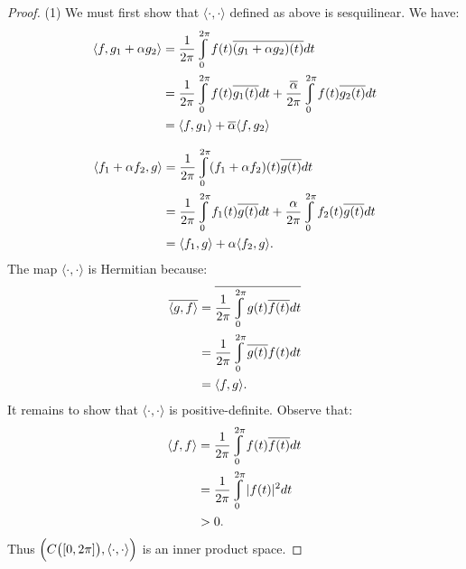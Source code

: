 \documentclass[11pt,twoside,openany]{memoir}
\renewcommand{\int}{\varint}
\begin{document}
        \begin{proof}
            (1) We must first show that $\langle\cdot,\cdot \rangle$ defined as above is sesquilinear. We have:
                \begin{equation*}
                \begin{split}
                    \langle f, g_1 + \alpha g_2 \rangle
                    & = \frac{1}{2\pi} \int_0^{2\pi}f(t)\overline{(g_1 + \alpha g_2)(t)}dt \\
                    & = \frac{1}{2\pi} \int_0^{2\pi} f(t)\overline{g_1(t)}dt + \frac{\overline{\alpha}}{2\pi} \int_0^{2\pi}f(t)\overline{g_2(t)}dt \\
                    & = \langle f,g_1 \rangle + \overline{\alpha}\langle f,g_2 \rangle
                \end{split}
                \end{equation*}

                \begin{equation*}
                \begin{split}
                    \langle f_1 + \alpha f_2,g \rangle
                    & = \frac{1}{2\pi} \int_0^{2\pi}(f_1 + \alpha f_2)(t)\overline{g(t)}dt \\
                    & = \frac{1}{2\pi} \int_0^{2\pi} f_1(t)\overline{g(t)}dt + \frac{\alpha}{2\pi} \int_0^{2\pi} f_2(t)\overline{g(t)}dt \\
                    & = \langle f_1,g \rangle + \alpha \langle f_2,g \rangle.
                \end{split}
                \end{equation*}
            The map $\langle \cdot, \cdot \rangle$ is Hermitian because:
                \begin{equation*}
                \begin{split}
                    \overline{\langle g,f \rangle}
                    & = \overline{\frac{1}{2\pi} \int_0^{2\pi}g(t)\overline{f(t)}dt} \\
                    & = \frac{1}{2\pi} \int_0^{2\pi} \overline{g(t)}f(t)dt \\
                    & = \langle f,g \rangle.
                \end{split}
                \end{equation*}
            It remains to show that $\langle \cdot,\cdot \rangle$ is positive-definite. Observe that:
                \begin{equation*}
                \begin{split}
                    \langle f,f \rangle
                    & = \frac{1}{2\pi} \int_0^{2\pi}f(t)\overline{f(t)}dt \\
                    & = \frac{1}{2\pi} \int_0^{2\pi} |f(t)|^2 dt \\
                    & > 0.
                \end{split}
                \end{equation*}
            Thus $\Bigl(C\bigl([0,2\pi]\bigr),\langle \cdot,\cdot \rangle\Bigr)$ is an inner product space.


\end{proof}
\end{document}
